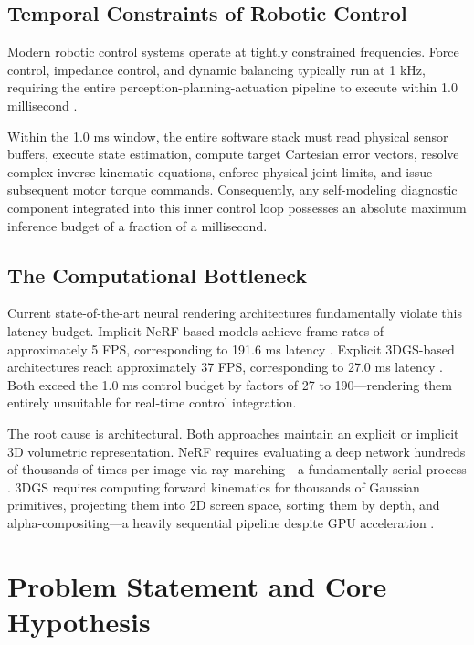 \documentclass[12pt,a4paper,oneside]{report}
\begin{document}
\subsection{Temporal Constraints of Robotic Control}
\label{subsec:temporal_constraints}

Modern robotic control systems operate at tightly constrained frequencies. Force control, impedance control, and dynamic balancing typically run at 1 kHz, requiring the entire perception-planning-actuation pipeline to execute within 1.0 millisecond \cite{siciliano2009robotics}. 

Within the 1.0 ms window, the entire software stack must read physical sensor buffers, execute state estimation, compute target Cartesian error vectors, resolve complex inverse kinematic equations, enforce physical joint limits, and issue subsequent motor torque commands. Consequently, any self-modeling diagnostic component integrated into this inner control loop possesses an absolute maximum inference budget of a fraction of a millisecond.

\subsection{The Computational Bottleneck}
\label{subsec:computational_bottleneck}

Current state-of-the-art neural rendering architectures fundamentally violate this latency budget. Implicit NeRF-based models achieve frame rates of approximately 5 FPS, corresponding to 191.6 ms latency \cite{hu2024teaching}. Explicit 3DGS-based architectures reach approximately 37 FPS, corresponding to 27.0 ms latency \cite{hu2025learning}. Both exceed the 1.0 ms control budget by factors of 27 to 190---rendering them entirely unsuitable for real-time control integration.

The root cause is architectural. Both approaches maintain an explicit or implicit 3D volumetric representation. NeRF requires evaluating a deep network hundreds of thousands of times per image via ray-marching---a fundamentally serial process \cite{mildenhall2020nerf}. 3DGS requires computing forward kinematics for thousands of Gaussian primitives, projecting them into 2D screen space, sorting them by depth, and alpha-compositing---a heavily sequential pipeline despite GPU acceleration \cite{kerbl20233d}.

\section{Problem Statement and Core Hypothesis}
\label{sec:problem_hypothesis_intro}
\end{document}
